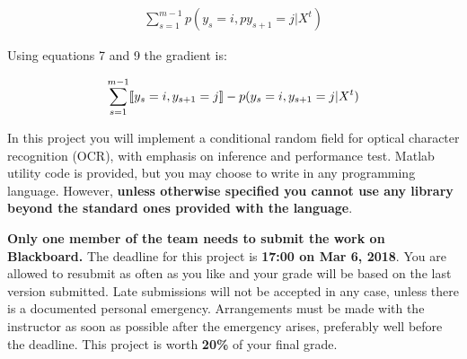 \documentclass[11pt]{report}
\begin{document}
	\begin{align}
	 \sum_{s=1}^{m-1} {p(y_s=i, py_{s+1}=j | X^t)}
	\end{align}


	Using equations 7 and 9 the gradient is:

	\begin{align}
	\sum_{s=1}^{m-1} [\![y_s = i, y_{s+1} = j]\!] - p(y_s=i, y_{s+1}=j | X^t)
	\end{align}
	




























	In this project you will implement a conditional random field for optical character recognition (OCR),
	with emphasis on inference and performance test.
	Matlab utility code is provided, but you may choose to write in any programming
	language.
	However, {\bf unless otherwise specified you cannot use any library beyond the standard ones provided with the language}.
	
	{\bf Only one member of the team needs to submit the work on Blackboard.}
	The deadline for this project is {\bf 17:00 on Mar 6, 2018}.
	You are allowed to resubmit as often
	as you like and your grade will be based on the last version submitted.
	Late submissions will not be accepted in any case, unless there is a documented personal emergency.  Arrangements must be made with the instructor as soon as possible after the emergency arises,
	preferably well before the deadline.
	This project is worth {\bf 20\%} of your final grade.
	
\end{document}
